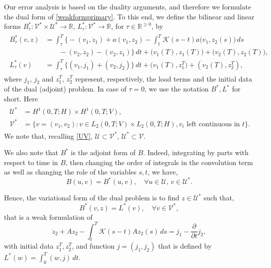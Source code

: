 \documentclass{amsart}
\numberwithin{equation}{section}
\theoremstyle{definition}
\begin{document}
Our error analysis is based on the duality arguments, 
and therefore we formulate 
the dual form of \eqref{weakformprimary}. 
To this end, we define the bilinear and linear forms
$B_\tau^*:{\mathcal V}^*\times{\mathcal U}^*\to{\mathbb R},\,
L_\tau^*:{\mathcal V}^*\to{\mathbb R}$,
 for $\tau\in \mathbb{R}^{\ge 0}$, by
\begin{align}  \label{BLdual}
  \begin{aligned}
    B_\tau^*(v,z)
    &=\int_{\tau}^T\!
      \Big\{-(v_1,\dot z_1)+a(v_1,z_2)
        -\int_t^T\!{\mathcal K}(s-t)a\big(v_1,z_2(s)\big)\,ds\\
    &\qquad - (v_2,\dot{z}_2)-(v_2,z_1) \Big\}\,dt
        +\big(v_1(T),z_1(T)\big)
        +\big(v_2(T),z_2(T)\big),\\
    L^*_\tau(v)
    &=\int_{\tau}^{T}\!
      \Big\{(v_1,j_1)+(v_2,j_2)\Big\}\,dt
        +\big(v_1(T),z_1^{T}\big)
        +(v_2(T),z_2^{T}),
  \end{aligned}
\end{align}
where $j_1,\,j_2$ and $z_1^{T},\,z_2^{T}$ represent, respectively,
the load terms and the initial data of the dual (adjoint) problem.
In case of $\tau=0$, we use the notation
$B^*,L^*$ for short.
Here
\begin{align}   \label{UVdual}
  \begin{aligned}
    {\mathcal U}^*&=H^1(0,T;H)\times H^1(0,T;V),\\
    {\mathcal V}^*&=\big\{v=(v_1,v_2):
      v\in L_2(0,T;V)\times L_2(0,T;H),
      
      v_i \text{ left continuous in }t \big\}.
  \end{aligned}
\end{align}
We note that, recalling \eqref{UV},  
${\mathcal U}\subset {\mathcal V}^*,\,{\mathcal U}^*\subset{\mathcal V}$.

We also note that $B^*$ is the adjoint form of $B$. 
Indeed, integrating by parts with respect to time 
in $B$, then changing the order of integrals in the convolution 
term as well as changing the role of the variables $s,t$, we have,
\begin{equation}   \label{BequalBstar}
  B(u,v)=B^*(u,v),\quad \forall u\in{\mathcal U},\, v\in{\mathcal U}^*.
\end{equation}

Hence, the variational form of the dual problem
is to find $z\in {\mathcal U}^*$ such that,
\begin{equation}   \label{weakformdual}
  B^*(v,z)=L^*(v),\quad \forall v\in{\mathcal V}^*,
\end{equation}
that is a weak formulation of
\begin{equation}   \label{z2dual}
  \ddot z_2+Az_2-\int_t^T\!
  {\mathcal K}(s-t)Az_2(s)\,ds=j_1-\frac{\partial}{\partial t} j_2,
\end{equation}
with initial data $z_1^T,z_2^T$, and function $j=(j_1,j_2)$ that 
is defined by $L^*(w)=\int_0^T\!(w,j)\,dt$.
\end{document}
